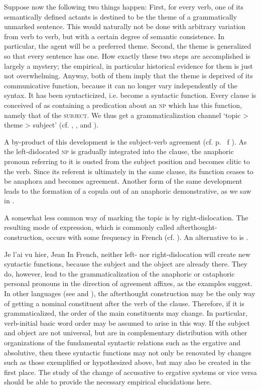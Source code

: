 Suppose now the following two things happen: First, for every verb, one of its semantically defined actants is destined to be the theme of a grammatically unmarked sentence. This would naturally not be done with arbitrary variation from verb to verb, but with a certain degree of semantic consistence. In particular, the agent will be a preferred theme. Second, the theme is generalized so that every sentence has one. How exactly these two steps are accomplished is largely a mystery; the empirical, in particular historical evidence for them is just not overwhelming. Anyway, both of them imply that the theme is deprived of its communicative function, because it can no longer vary independently of the syntax. It has been syntacticized, i.e. become a syntactic function. Every clause is conceived of as containing a predication about an \textsc{np} which has this function, namely that of the \textsc{subject}. We thus get a grammaticalization channel ‘topic {\textgreater} theme {\textgreater} subject’ (cf. \citealt[484]{LiEtAl1976}, \citealt[83--85]{Givón1979}, \citealt[114]{Comrie1981b} and \citealt[99--101]{MallinsonEtAl1981}).

A by-product of this development is the subject-verb agreement (cf. p.~\pageref{page44}\chk%
f  ). As the left-dislocated \textsc{np} is gradually integrated into the clause, the anaphoric pronoun referring to it is ousted from the subject position and becomes clitic to the verb. Since its referent is ultimately in the same clause, its function ceases to be anaphora and becomes agreement. Another form of the same development leads to the formation of a copula out of an anaphoric demonstrative, as we saw in .

A somewhat less common way of marking the topic is by right-dislocation. The resulting mode of expression, which is commonly called afterthought-construction, occurs with some frequency in French (cf. \citealt[402, 427]{MallinsonEtAl1981}). An alternative to  is .

\ea \label{ex:E94}
  Je l'ai vu hier, Jean
  \z
\noindent In French, neither left- nor right-dislocation will create new syntactic functions, because the subject and the object are already there. They do, however, lead to the grammaticalization of the anaphoric or cataphoric personal pronouns in the direction of agreement affixes, as the examples suggest. In other languages (see \citealt[119--121]{Hyman1975} and \citealt[170]{Vincent1980a}), the afterthought construction may be the only way of getting a nominal constituent after the verb of the clause. Therefore, if it is grammaticalized, the order of the main constituents may change. In particular, verb-initial basic word order may be assumed to arise in this way. If the subject and object are not universal, but are in complementary distribution with other organizations of the fundamental syntactic relations such as the ergative and absolutive, then these syntactic functions may not only be renovated by changes such as those exemplified or hypothesized above, but may also be created in the first place. The study of the change of accusative to ergative systems or vice versa should be able to provide the necessary empirical elucidations here.

